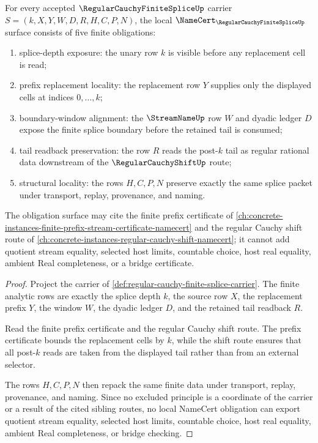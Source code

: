 \begin{theorem}
\label{thm:regular-cauchy-finite-splice-namecert-obligations}
For every accepted $\RegularCauchyFiniteSpliceUp$ carrier $S=(k,X,Y,W,D,R,H,C,P,N)$, the local $\NameCert_{\RegularCauchyFiniteSpliceUp}$ surface consists of five finite obligations:
\begin{enumerate}
\item splice-depth exposure: the unary row $k$ is visible before any replacement cell is read;
\item prefix replacement locality: the replacement row $Y$ supplies only the displayed cells at indices $0,\ldots,k$;
\item boundary-window alignment: the $\StreamNameUp$ row $W$ and dyadic ledger $D$ expose the finite splice boundary before the retained tail is consumed;
\item tail readback preservation: the row $R$ reads the post-$k$ tail as regular rational data downstream of the $\RegularCauchyShiftUp$ route;
\item structural locality: the rows $H,C,P,N$ preserve exactly the same splice packet under transport, replay, provenance, and naming.
\end{enumerate}
The obligation surface may cite the finite prefix certificate of \autoref{ch:concrete-instances-finite-prefix-stream-certificate-namecert} and the regular Cauchy shift route of \autoref{ch:concrete-instances-regular-cauchy-shift-namecert}; it cannot add quotient stream equality, selected host limits, countable choice, host real equality, ambient Real completeness, or a bridge certificate.
\end{theorem}
\begin{proof}
Project the carrier of \autoref{def:regular-cauchy-finite-splice-carrier}. The finite analytic rows are exactly the splice depth $k$, the source row $X$, the replacement prefix $Y$, the window $W$, the dyadic ledger $D$, and the retained tail readback $R$.

Read the finite prefix certificate and the regular Cauchy shift route. The prefix certificate bounds the replacement cells by $k$, while the shift route ensures that all post-$k$ reads are taken from the displayed tail rather than from an external selector.

The rows $H,C,P,N$ then repack the same finite data under transport, replay, provenance, and naming. Since no excluded principle is a coordinate of the carrier or a result of the cited sibling routes, no local NameCert obligation can export quotient stream equality, selected host limits, countable choice, host real equality, ambient Real completeness, or bridge checking.
\end{proof}

